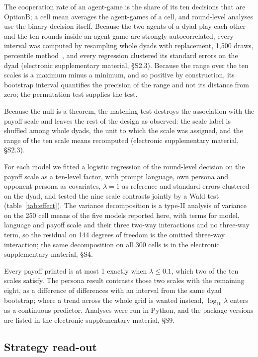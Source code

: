\documentclass[11pt,a4paper]{article}
\newcommand{\lam}{\lambda}
\begin{document}
The cooperation rate of an agent-game is the share of its ten decisions that are
OptionB; a cell mean averages the agent-games of a cell, and round-level
analyses use the binary decision itself. Because the two agents of a dyad play
each other and the ten rounds inside an agent-game are strongly autocorrelated,
every interval was computed by resampling whole dyads with replacement,
1{,}500 draws, percentile method~\citep{efron1993introduction}, and every
regression clustered its standard errors on the dyad (electronic supplementary
material, \S S2.3).
Because the range over the ten scales is a maximum minus a minimum, and so
positive by construction, its bootstrap interval quantifies the precision of the
range and not its distance from zero; the permutation test supplies the test.

Because the null is a theorem, the matching test destroys the association with
the payoff scale and leaves the rest of the design as observed: the scale label
is shuffled among whole dyads, the unit to which the scale was assigned, and the
range of the ten scale means recomputed (electronic supplementary material,
\S S2.3).

For each model we fitted a logistic regression of the round-level decision on
the payoff scale as a ten-level factor, with prompt language, own persona and
opponent persona as covariates, $\lam = 1$ as reference and standard errors
clustered on the dyad, and tested the nine scale contrasts jointly by a Wald
test (table~\ref{tab:effect}). The variance decomposition is a type-II analysis
of variance on the 250 cell means of the five models reported here, with terms
for model, language and payoff scale and their three two-way interactions and no
three-way term, so the residual on 144 degrees of freedom is the omitted
three-way interaction; the same decomposition on all 300 cells is in the
electronic supplementary material, \S S4.

Every payoff printed is at most 1 exactly when $\lam \leq 0.1$, which two of the
ten scales satisfy. The persona result contrasts those two scales with the
remaining eight, as a difference of differences with an interval from the same
dyad bootstrap; where a trend across the whole grid is wanted instead,
$\log_{10}\lam$ enters as a continuous predictor. Analyses were run in Python,
and the package versions are listed in the electronic supplementary material,
\S S9.

\subsection{Strategy read-out}
\end{document}
